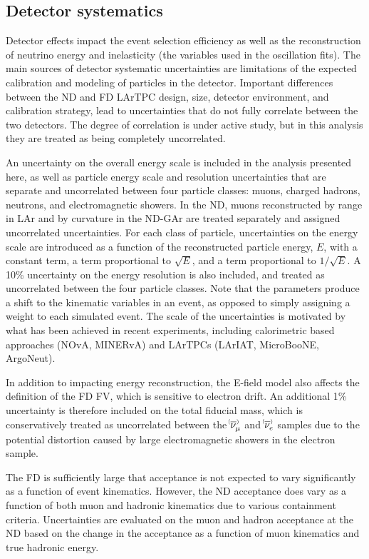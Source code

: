 \subsection{Detector systematics}
Detector effects impact the event selection efficiency as well as the reconstruction of neutrino energy and inelasticity (the variables used in the oscillation fits). The main sources of detector systematic uncertainties are limitations of the expected calibration and modeling of particles in the detector. Important differences between the ND and FD LArTPC design, size, detector environment, and calibration strategy, lead to uncertainties that do not fully correlate between the two detectors. The degree of correlation is under active study, but in this analysis they are treated as being completely uncorrelated.

An uncertainty on the overall energy scale is included in the analysis presented here, as well as particle energy scale and resolution uncertainties that are separate and uncorrelated between four particle classes: muons, charged hadrons, neutrons, and electromagnetic showers. In the ND, muons reconstructed by range in LAr and by curvature in the ND-GAr are treated separately and assigned uncorrelated uncertainties. For each class of particle, uncertainties on the energy scale are introduced as a function of the reconstructed particle energy, $E$, with a constant term, a term proportional to $\sqrt{E}$, and a term proportional to $1/\sqrt{E}$. A 10\% uncertainty on the energy resolution is also included, and treated as uncorrelated between the four particle classes. Note that the parameters produce a shift to the kinematic variables in an event, as opposed to simply assigning a weight to each simulated event. The scale of the uncertainties is motivated by what has been achieved in recent experiments, including calorimetric based approaches (NOvA, MINERvA) and LArTPCs (LArIAT, MicroBooNE, ArgoNeut).

In addition to impacting energy reconstruction, the E-field model also affects the definition of the FD FV, which is sensitive to electron drift. An additional 1\% uncertainty is therefore included on the total fiducial mass, which is conservatively treated as uncorrelated between the $\nu^{\bracketbar}_{\mu}$ and $\nu^{\bracketbar}_{e}$ samples due to the potential distortion caused by large electromagnetic showers in the electron sample.

The FD is sufficiently large that acceptance is not expected to vary significantly as a function of event kinematics. However, the ND acceptance does vary as a function of both muon and hadronic kinematics due to various containment criteria. Uncertainties are evaluated on the muon and hadron acceptance at the ND based on the change in the acceptance as a function of muon kinematics and true hadronic energy.

